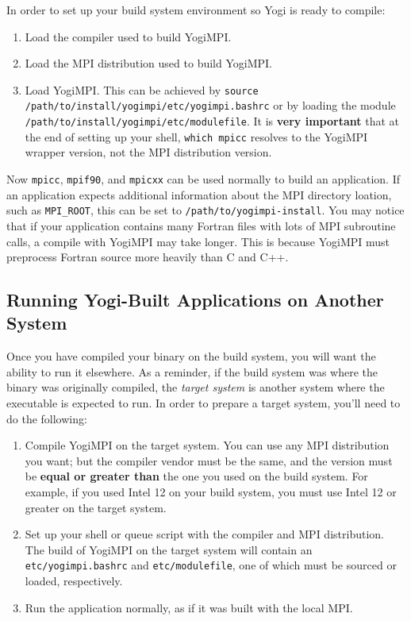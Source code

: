 \documentclass{article}
\begin{document}
In order to set up your build system environment so Yogi is ready to compile:

\begin{enumerate}
\item Load the compiler used to build YogiMPI.
\item Load the MPI distribution used to build YogiMPI.
\item Load YogiMPI.  This can be achieved by \texttt{source /path/to/install/yogimpi/etc/yogimpi.bashrc} or by loading the module \texttt{/path/to/install/yogimpi/etc/modulefile}.  It is \textbf{very important} that at the end of setting up your shell, \texttt{which mpicc} resolves to the YogiMPI wrapper version, not the MPI distribution version.
\end{enumerate}

Now \texttt{mpicc}, \texttt{mpif90}, and \texttt{mpicxx} can be used normally to build an application. If an application expects additional information about the MPI directory loation, such as \texttt{MPI\_ROOT}, this can be set to \texttt{/path/to/yogimpi-install}. You may notice that if your application contains many Fortran files with lots of MPI subroutine calls, a compile with YogiMPI may take longer.  This is because YogiMPI must preprocess Fortran source more heavily than C and C++.

\subsection{Running Yogi-Built Applications on Another System}

Once you have compiled your binary on the build system, you will want the ability to run it elsewhere.  As a reminder, if the build system was where the binary was originally compiled, the \textit{target system} is another system where the executable is expected to run.  In order to prepare a target system, you'll need to do the following:

\begin{enumerate}
\item Compile YogiMPI on the target system.  You can use any MPI distribution you want; but the compiler vendor must be the same, and the version must be \textbf{equal or greater than} the one you used on the build system.  For example, if you used Intel 12 on your build system, you must use Intel 12 or greater on the target system.
\item Set up your shell or queue script with the compiler and MPI distribution.  The build of YogiMPI on the target system will contain an \texttt{etc/yogimpi.bashrc} and \texttt{etc/modulefile}, one of which must be sourced or loaded, respectively.
\item Run the application normally, as if it was built with the local MPI.
\end{enumerate}
\end{document}
